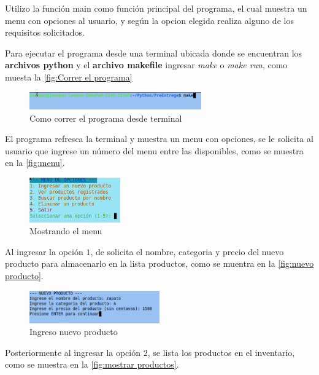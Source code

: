 \documentclass[12pt]{article}
\begin{document}
Utilizo la función main como función principal del programa, el cual muestra un menu con opciones al usuario, y según la opcion elegida realiza alguno de los requisitos solicitados.

Para ejecutar el programa desde una terminal ubicada donde se encuentran los \textbf{archivos python} y el \textbf{archivo makefile} ingresar \textit{make} o \textit{make run}, como muesta la \autoref{fig:Correr el programa}

\begin{figure}[H]
	\centering
	\setlength{\fboxrule}{0pt}
	\includegraphics[width=0.66\textwidth]{Imagenes/img0.png}
	\caption{Como correr el programa desde terminal}
	\label{fig:Correr el programa}
\end{figure}  

El programa refresca la terminal y muestra un menu con opciones, se le solicita al usuario que ingrese un número del menu entre las disponibles, como se muestra en la \autoref{fig:menu}.

\begin{figure}[H]
	\centering
	\setlength{\fboxrule}{0pt}
	\includegraphics[width=0.35\textwidth]{Imagenes/menu.png}
	\caption{Mostrando el menu}
	\label{fig:menu}
\end{figure} 

Al ingresar la opción $1$, de solicita el nombre, categoria y precio del nuevo producto para almacenarlo en la lista productos, como se muentra en la \autoref{fig:nuevo producto}.

\begin{figure}[H]
	\centering
	\setlength{\fboxrule}{0pt}
	\includegraphics[width=0.5\textwidth]{Imagenes/img2.png}
	\caption{Ingreso nuevo producto}
	\label{fig:nuevo producto}
\end{figure} 

Posteriormente al ingresar la opción $2$, se lista los productos en el inventario, como se muestra en la \autoref{fig:mostrar productos}.
\end{document}

